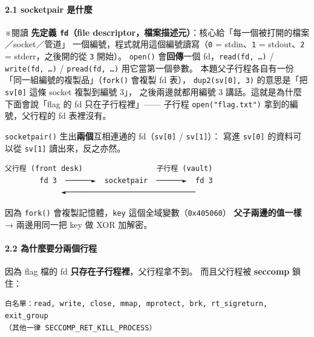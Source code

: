 \documentclass[10pt,a4paper]{article}
\renewenvironment{quote}{%
  \begin{mdframed}[linewidth=0pt,innerleftmargin=0pt,innerrightmargin=0pt,
    innerbottommargin=0pt,innertopmargin=0pt,skipabove=0.55em,skipbelow=0.55em,
    leftmargin=0.9em,rightmargin=0.4em,startcode={\color{quotebar}\vrule width 2.6pt},%
    endcode={}]%
  \itshape\color{black}%
}{%
  \end{mdframed}%
}
\begin{document}
\paragraph{2.1 socketpair 是什麼}\label{socketpair-ux662fux4ec0ux9ebc}

\begin{quote}
※閱讀 \textbf{先定義 \texttt{fd}（file
descriptor，檔案描述元）}：核心給「每一個被打開的檔案／socket／管道」
一個編號，程式就用這個編號讀寫（\texttt{0} = stdin、\texttt{1} =
stdout、\texttt{2} = stderr，之後開的從 \texttt{3} 開始）。
\texttt{open()} 會\textbf{回傳}一個 fd，\texttt{read(fd,\allowbreak{}\ \allowbreak{}…)} /
\texttt{write(fd,\allowbreak{}\ \allowbreak{}…)} / \texttt{pread(fd,\allowbreak{}\ \allowbreak{}…)} 用它當第一個參數。
本題父子行程各自有一份「同一組編號的複製品」（\texttt{fork()} 會複製 fd
表）， \texttt{dup2(sv{[}0{]},\allowbreak{}\ \allowbreak{}3)} 的意思是「把 \texttt{sv{[}0{]}} 這條
socket 複製到編號 3」， 之後兩邊就都用編號 3
講話。這就是為什麼下面會說「flag 的 fd 只在子行程裡」------ 子行程
\texttt{open("flag.\allowbreak{}txt")} 拿到的編號，父行程的 fd 表裡沒有。
\end{quote}

\texttt{socketpair()} 生出\textbf{兩個}互相連通的 fd（\texttt{sv{[}0{]}}
/ \texttt{sv{[}1{]}}）： 寫進 \texttt{sv{[}0{]}} 的資料可以從
\texttt{sv{[}1{]}} 讀出來，反之亦然。

\begin{Verbatim}[breaklines=true,breakanywhere=true,breakautoindent=false,fontsize=\fontsize{7.0}{9.5}\selectfont]
   父行程 (front desk)                 子行程 (vault)
        fd 3  ──────►  socketpair  ──────►  fd 3
             ◄──────────────────────────────
\end{Verbatim}

因為 \texttt{fork()} 會複製記憶體，\texttt{key}
這個全域變數（\texttt{0x405060}） \textbf{父子兩邊的值一樣} →
兩邊用同一把 key 做 XOR 加解密。

\paragraph{2.2
為什麼要分兩個行程}\label{ux70baux4ec0ux9ebcux8981ux5206ux5169ux500bux884cux7a0b}

因為 flag 檔的 fd \textbf{只存在子行程裡}，父行程拿不到。 而且父行程被
\textbf{seccomp} 鎖住：

\begin{Verbatim}[breaklines=true,breakanywhere=true,breakautoindent=false,fontsize=\fontsize{7.0}{9.5}\selectfont]
白名單：read, write, close, mmap, mprotect, brk, rt_sigreturn, exit_group
（其他一律 SECCOMP_RET_KILL_PROCESS）
\end{Verbatim}
\end{document}
